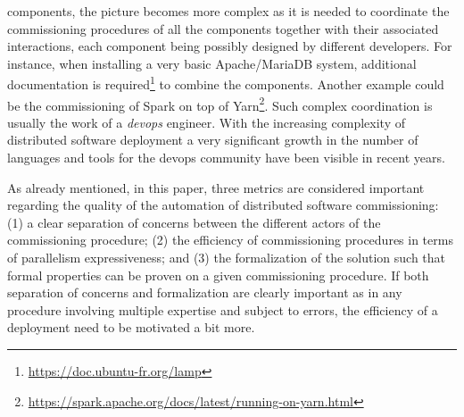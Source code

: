 components, the picture becomes more complex as it is needed to coordinate
the commissioning procedures of all the components together with their associated
interactions, each component being possibly designed by different developers. For instance, when installing a very basic Apache/MariaDB system,
additional documentation is
required\footnote{\url{https://doc.ubuntu-fr.org/lamp}} to combine the components. Another example could be the commissioning of Spark on top of Yarn\footnote{\url{https://spark.apache.org/docs/latest/running-on-yarn.html}}. %
%
Such complex coordination is usually the work of a \emph{devops} engineer. With the increasing complexity of distributed software deployment a very significant growth in the number of languages and tools for the devops community have been visible in recent years.

As already mentioned, in this paper, three metrics are considered important regarding the quality of the automation of distributed software commissioning: (1) a clear separation of concerns between the different actors of the commissioning procedure; (2) the efficiency of commissioning procedures in terms of parallelism expressiveness; and (3) the formalization of the solution such that formal properties can be proven on a given commissioning procedure. If both separation of concerns and formalization are clearly important as in any procedure involving multiple expertise and subject to errors, the efficiency of a deployment need to be motivated a bit more.

